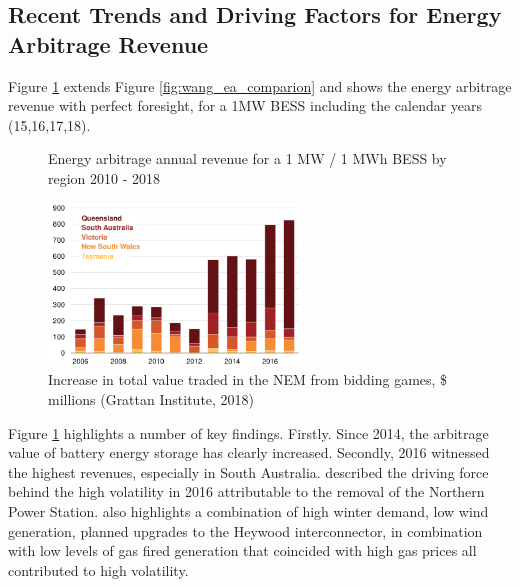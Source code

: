 \subsection{ Recent Trends and Driving Factors for Energy Arbitrage Revenue }
Figure \ref{fig:wang_plot_full} extends Figure \ref{fig:wang_ea_comparion} and shows the energy arbitrage revenue with perfect foresight, for a 1MW BESS including the calendar years (15,16,17,18). 
\begin{figure}[H]
    \centering
    \caption{Energy arbitrage annual revenue for a 1 MW / 1 MWh BESS by region 2010 - 2018}
    \label{fig:wang_plot_full}
\end{figure}
\begin{figure}
    \begin{center}
        \includegraphics[width=0.6\textwidth]{Pictures/Chapter3/generator_gaming.png}
    \end{center}
    \caption{Increase in total value traded in the NEM from bidding games, \$ millions (Grattan Institute, 2018)}
    \label{fig:generator_gaming}
\end{figure}
Figure \ref{fig:wang_plot_full} highlights a number of key findings. Firstly. Since 2014, the arbitrage value of battery energy storage has clearly increased. 
\newline
Secondly, 2016 witnessed the highest revenues,  especially in South Australia.  \parencite{2016_prices} described the driving force behind the high volatility in 2016 attributable to the removal of the Northern Power Station. \textcite{2016_prices} also highlights a combination of high winter demand, low wind generation, planned upgrades to the Heywood interconnector, in combination with low levels of gas fired generation that coincided with high gas prices all contributed to high volatility.
\newline
